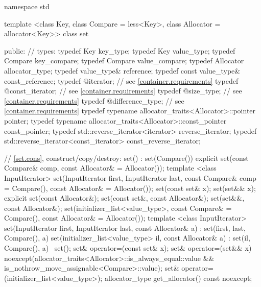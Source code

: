 \begin{codeblock}
namespace std {
  template <class Key, class Compare = less<Key>,
            class Allocator = allocator<Key>>
  class set {
  public:
    // types:
    typedef Key                                                 key_type;
    typedef Key                                                 value_type;
    typedef Compare                                             key_compare;
    typedef Compare                                             value_compare;
    typedef Allocator                                           allocator_type;
    typedef value_type&                                         reference;
    typedef const value_type&                                   const_reference;
    typedef @\impdefnc@                              iterator;        // see \ref{container.requirements}
    typedef @\impdefnc@                              const_iterator;  // see \ref{container.requirements}
    typedef @\impdefnc@                              size_type;       // see \ref{container.requirements}
    typedef @\impdefnc@                              difference_type; // see \ref{container.requirements}
    typedef typename allocator_traits<Allocator>::pointer       pointer;
    typedef typename allocator_traits<Allocator>::const_pointer const_pointer;
    typedef std::reverse_iterator<iterator>                     reverse_iterator;
    typedef std::reverse_iterator<const_iterator>               const_reverse_iterator;

    // \ref{set.cons}, construct/copy/destroy:
    set() : set(Compare()) { }
    explicit set(const Compare& comp, const Allocator& = Allocator());
    template <class InputIterator>
      set(InputIterator first, InputIterator last,
          const Compare& comp = Compare(), const Allocator& = Allocator());
    set(const set& x);
    set(set&& x);
    explicit set(const Allocator&);
    set(const set&, const Allocator&);
    set(set&&, const Allocator&);
    set(initializer_list<value_type>, const Compare& = Compare(),
        const Allocator& = Allocator());
    template <class InputIterator>
      set(InputIterator first, InputIterator last, const Allocator& a)
        : set(first, last, Compare(), a) { }
    set(initializer_list<value_type> il, const Allocator& a)
      : set(il, Compare(), a) { }
    ~set();
    set& operator=(const set& x);
    set& operator=(set&& x)
      noexcept(allocator_traits<Allocator>::is_always_equal::value &&
               is_nothrow_move_assignable<Compare>::value);
    set& operator=(initializer_list<value_type>);
    allocator_type get_allocator() const noexcept;

}}
\end{codeblock}
